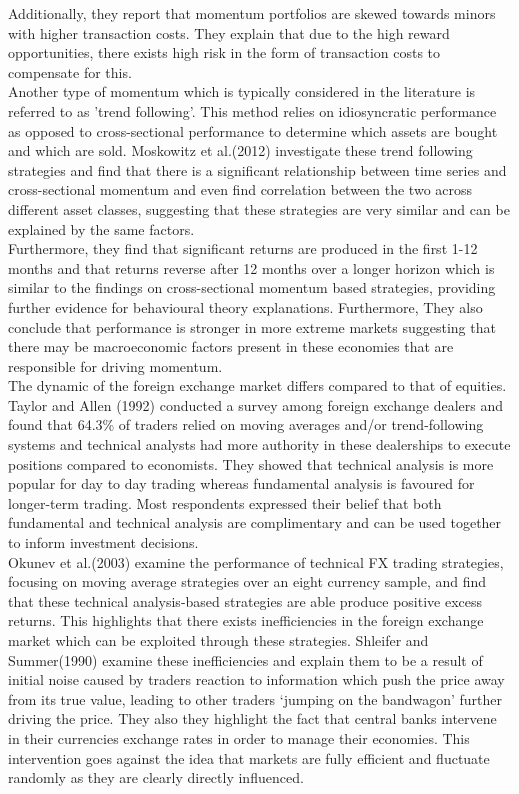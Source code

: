 \documentclass{article}
\begin{document}
Additionally, they report that momentum portfolios are skewed towards minors with higher transaction costs. They explain that due to the high reward opportunities, there exists high risk in the form of transaction costs to compensate for this. \\

Another type of momentum which is typically considered in the literature is referred to as 'trend following'. This method relies on idiosyncratic performance as opposed to cross-sectional performance to determine which assets are bought and which are sold. Moskowitz  et al.(2012) investigate these trend following strategies and find that there is a significant relationship between time series and cross-sectional momentum and even find correlation between the two across different asset classes, suggesting that these strategies are very similar and can be explained by the same factors.\\

Furthermore, they find that significant returns are produced in the first 1-12 months and that returns reverse after 12 months over a longer horizon which is similar to the findings on cross-sectional momentum based strategies, providing further evidence for behavioural theory explanations. Furthermore, They also conclude that performance is stronger in more extreme markets suggesting that there may be macroeconomic factors present in these economies that are responsible for driving momentum.\\

The dynamic of the foreign exchange market differs compared to that of equities. Taylor and Allen (1992) conducted a survey among foreign exchange dealers and found that 64.3\% of traders relied on moving averages and/or trend-following systems and technical analysts had more authority in these dealerships to execute positions compared to economists. They showed that technical analysis is more popular for day to day trading whereas fundamental analysis is favoured for longer-term trading. Most respondents expressed their belief that both fundamental and technical analysis are complimentary and can be used together to inform investment decisions. \\


Okunev et al.(2003) examine the performance of technical FX trading strategies, focusing on moving average strategies over an eight currency sample, and find that these technical analysis-based strategies are able produce positive excess returns. This highlights that there exists inefficiencies in the foreign exchange market which can be exploited through these strategies. Shleifer and Summer(1990) examine these inefficiencies and explain them to be a result of initial noise caused by traders reaction to information which push the price away from its true value, leading to other traders ‘jumping on the bandwagon’ further driving the price. They also they highlight the fact that central banks intervene in their currencies exchange rates in order to manage their economies. This intervention goes against the idea that markets are fully efficient and fluctuate randomly as they are clearly directly influenced.\\
\end{document}
